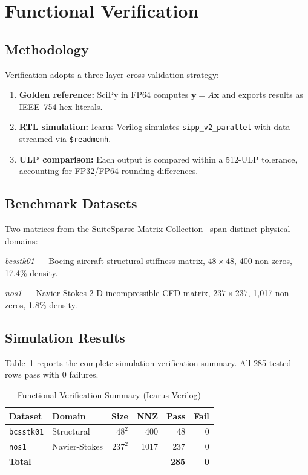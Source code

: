 \documentclass[journal,a4paper]{IEEEtran}
\begin{document}
\section{Functional Verification}

\subsection{Methodology}

Verification adopts a three-layer cross-validation strategy:
\begin{enumerate}
  \item \textbf{Golden reference:} SciPy in FP64 computes
        $\mathbf{y}=A\mathbf{x}$ and exports results as
        IEEE~754 hex literals.
  \item \textbf{RTL simulation:} Icarus Verilog simulates
        \texttt{sipp\_v2\_parallel} with data streamed via
        \texttt{\$readmemh}.
  \item \textbf{ULP comparison:} Each output is compared within a
        512-ULP tolerance, accounting for FP32/FP64 rounding differences.
\end{enumerate}

\subsection{Benchmark Datasets}

Two matrices from the SuiteSparse Matrix Collection~\cite{davis2011}
span distinct physical domains:

\textit{bcsstk01} --- Boeing aircraft structural stiffness matrix,
$48\!\times\!48$, 400 non-zeros, 17.4\% density.

\textit{nos1} --- Navier-Stokes 2-D incompressible CFD matrix,
$237\!\times\!237$, 1,017 non-zeros, 1.8\% density.

\subsection{Simulation Results}

Table~\ref{tab:verif} reports the complete simulation verification
summary. All 285 tested rows pass with 0 failures.

\begin{table}[!t]
\centering
\caption{Functional Verification Summary (Icarus Verilog)}
\label{tab:verif}
\begin{tabular}{llrrrr}
\toprule
Dataset & Domain & Size & NNZ & Pass & Fail \\
\midrule
\texttt{bcsstk01} & Structural  & $48^2$  & 400  & 48  & 0 \\
\texttt{nos1}     & Navier-Stokes & $237^2$ & 1017 & 237 & 0 \\
\midrule
\textbf{Total} & & & & \textbf{285} & \textbf{0} \\
\bottomrule
\end{tabular}
\end{table}
\end{document}
